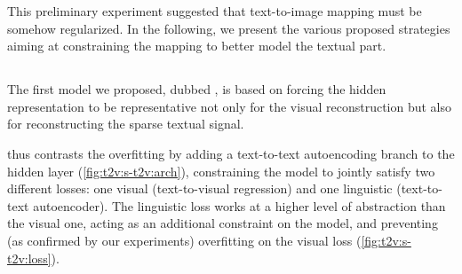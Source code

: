 This preliminary experiment suggested that text-to-image mapping must be somehow regularized.
In the following, we present the various proposed strategies aiming at constraining the mapping to better model the textual part.
\subsection{\sparsettv{}}
\label{subsec:t2v:sparse-t2v}


The first model we proposed, dubbed \sparsettv{}, is based on forcing the hidden representation to be representative not only for the visual reconstruction but also for reconstructing the sparse textual signal.

\sparsettv{} thus contrasts the overfitting by adding a text-to-text autoencoding branch to the hidden layer (\ref{fig:t2v:s-t2v:arch}), constraining the model to jointly satisfy two different losses: one visual (text-to-visual regression) and one linguistic (text-to-text autoencoder).
The linguistic loss works at a higher level of abstraction than the visual one, acting as an additional constraint on the model, and preventing (as confirmed by our experiments) overfitting on the visual loss (\ref{fig:t2v:s-t2v:loss}).


